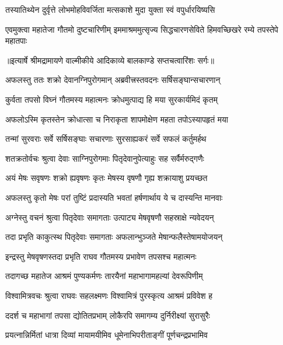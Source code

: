 \twolineshloka
{तस्यातिथ्येन दुर्वृत्ते लोभमोहविवर्जिता}
{मत्सकाशे मुदा युक्ता स्वं वपुर्धारयिष्यसि} %

\threelineshloka
{एवमुक्त्वा महातेजा गौतमो दुष्टचारिणीम्}
{इममाश्रममुत्सृज्य सिद्धचारणसेविते}
{हिमवच्छिखरे रम्ये तपस्तेपे महातपाः} %


{॥इत्यार्षे श्रीमद्रामायणे वाल्मीकीये आदिकाव्ये बालकाण्डे सप्तचत्वारिंशः सर्गः॥}


\twolineshloka
{अफलस्तु ततः शक्रो देवानग्निपुरोगमान्}
{अब्रवीत्त्रस्तवदनः सर्षिसङ्घान्सचारणान्} %

\twolineshloka
{कुर्वता तपसो विघ्नं गौतमस्य महात्मनः}
{क्रोधमुत्पाद्य हि मया सुरकार्यमिदं कृतम्} %

\twolineshloka
{अफलोऽस्मि कृतस्तेन क्रोधात्सा च निराकृता}
{शापमोक्षेण महता तपोऽस्यापहृतं मया} %

\twolineshloka
{तन्मां सुरवराः सर्वे सर्षिसङ्घाः सचारणाः}
{सुरसाह्यकरं सर्वे सफलं कर्तुमर्हथ} %

\twolineshloka
{शतक्रतोर्वचः श्रुत्वा देवाः साग्निपुरोगमाः}
{पितृदेवानुपेत्याहुः सह सर्वैर्मरुद्गणैः} %

\twolineshloka
{अयं मेषः सवृषणः शक्रो ह्यवृषणः कृतः}
{मेषस्य वृषणौ गृह्य शक्रायाशु प्रयच्छत} %

\twolineshloka
{अफलस्तु कृतो मेषः परां तुष्टिं प्रदास्यति}
{भवतां हर्षणार्थाय ये च दास्यन्ति मानवाः} %

\twolineshloka
{अग्नेस्तु वचनं श्रुत्वा पितृदेवाः समागताः}
{उत्पाट्य मेषवृषणौ सहस्राक्षे न्यवेदयन्} %

\twolineshloka
{तदा प्रभृति काकुत्स्थ पितृदेवाः समागताः}
{अफलान्भुञ्जते मेषान्फलैस्तेषामयोजयन्} %

\twolineshloka
{इन्द्रस्तु मेषवृषणस्तदा प्रभृति राघव}
{गौतमस्य प्रभावेण तपसश्च महात्मनः} %

\twolineshloka
{तदागच्छ महातेज आश्रमं पुण्यकर्मणः}
{तारयैनां महाभागामहल्यां देवरूपिणीम्} %

\twolineshloka
{विश्वामित्रवचः श्रुत्वा राघवः सहलक्ष्मणः}
{विश्वामित्रं पुरस्कृत्य आश्रमं प्रविवेश ह} %

\twolineshloka
{ददर्श च महाभागां तपसा द्योतितप्रभाम्}
{लोकैरपि समागम्य दुर्निरीक्ष्यां सुरासुरैः} %

\twolineshloka
{प्रयत्नान्निर्मितां धात्रा दिव्यां मायामयीमिव}
{धूमेनाभिपरीताङ्गीं पूर्णचन्द्रप्रभामिव} %

